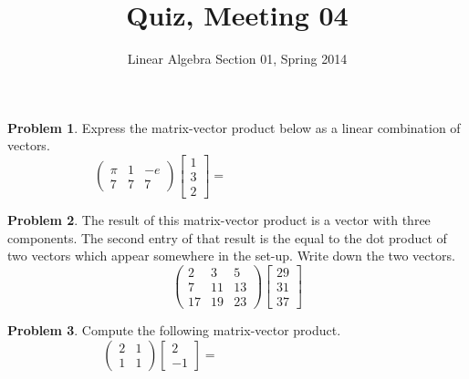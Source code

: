 \documentclass[11pt]{amsart}
\theoremstyle{definition}
\newtheorem{problem}{Problem}
\begin{document}
\title{Quiz, Meeting 04}
\author{Linear Algebra Section 01, Spring 2014}

\maketitle

\begin{problem}
Express the matrix-vector product below as a linear combination of vectors.
\[
\begin{pmatrix} \pi & 1 & -e \\ 7 & 7 & 7 \end{pmatrix}\begin{bmatrix} 1 \\ 3 \\ 2 \end{bmatrix} = \hspace{2in}
\]
\end{problem}

\vspace{.25in}

\begin{problem}
The result of this matrix-vector product is a vector with three components. The second entry of that result is the equal to the dot product of two vectors which appear somewhere in the set-up. Write down the two vectors.
\[
\begin{pmatrix} 2 & 3 & 5\\ 7 & 11 & 13 \\ 17 & 19 & 23 \end{pmatrix} \begin{bmatrix} 29 \\ 31 \\ 37 \end{bmatrix}
\]
\end{problem}

\vspace{1.5in}

\begin{problem}
Compute the following matrix-vector product.
\[
\begin{pmatrix} 2 & 1 \\ 1 & 1 \end{pmatrix} \begin{bmatrix} 2 \\ -1 \end{bmatrix} = \hspace{2in}
\]
\end{problem}



\vfill
\end{document}
